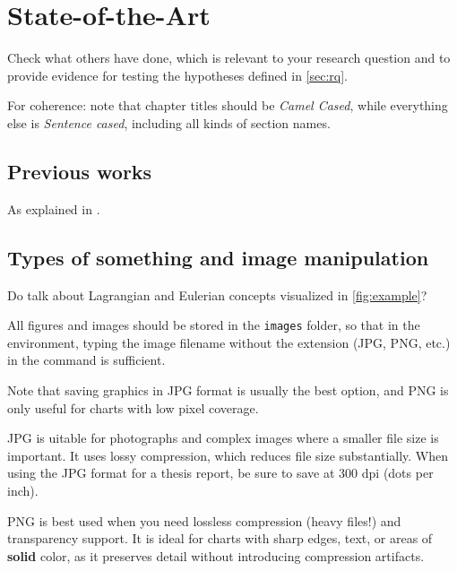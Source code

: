 \chapter{State-of-the-Art}
\label{ch:soa}


Check what others have done, which is relevant to your research question and to provide evidence for testing the hypotheses defined in \autoref{sec:rq}.

For coherence: note that chapter titles should be \textit{Camel Cased}, while everything else is \textit{Sentence cased}, including all kinds of section names.

\section{Previous works}
\label{sec:prevworks}
	
As explained in .
	
	
\section{Types of something and image manipulation}
\label{sec:typesome}

Do  talk about Lagrangian and Eulerian concepts visualized in \autoref{fig:example}?

All figures and images should be stored in the \texttt{images} folder, so that in the  environment, typing the image filename without the extension (JPG, PNG, etc.) in the  command is sufficient.

Note that saving graphics in JPG format is usually the best option, and PNG is only useful for charts with low pixel coverage.

JPG is uitable for photographs and complex images where a smaller file size is important. It uses lossy compression, which reduces file size substantially. When using the JPG format for a thesis report, be sure to save at 300 dpi (dots per inch).

PNG is best used when you need lossless compression (heavy files!) and transparency support. It is ideal for charts with sharp edges, text, or areas of \textbf{solid} color, as it preserves detail without introducing compression artifacts.

